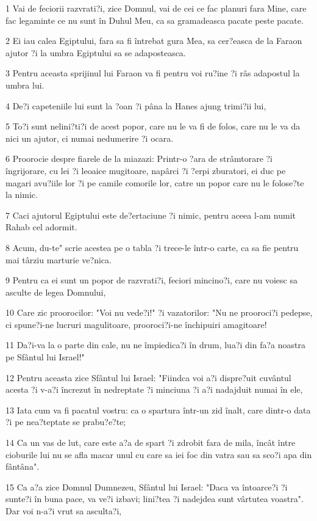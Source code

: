 \par 1 Vai de feciorii razvrati?i, zice Domnul, vai de cei ce fac planuri fara Mine, care fac legaminte ce nu sunt în Duhul Meu, ca sa gramadeasca pacate peste pacate.
\par 2 Ei iau calea Egiptului, fara sa fi întrebat gura Mea, sa cer?easca de la Faraon ajutor ?i la umbra Egiptului sa se adaposteasca.
\par 3 Pentru aceasta sprijinul lui Faraon va fi pentru voi ru?ine ?i râs adapostul la umbra lui.
\par 4 De?i capeteniile lui sunt la ?oan ?i pâna la Hanes ajung trimi?ii lui,
\par 5 To?i sunt nelini?ti?i de acest popor, care nu le va fi de folos, care nu le va da nici un ajutor, ci numai nedumerire ?i ocara.
\par 6 Proorocie despre fiarele de la miazazi: Printr-o ?ara de strâmtorare ?i îngrijorare, cu lei ?i leoaice mugitoare, napârci ?i ?erpi zburatori, ei duc pe magari avu?iile lor ?i pe camile comorile lor, catre un popor care nu le folose?te la nimic.
\par 7 Caci ajutorul Egiptului este de?ertaciune ?i nimic, pentru aceea l-am numit Rahab cel adormit.
\par 8 Acum, du-te" scrie acestea pe o tabla ?i trece-le într-o carte, ca sa fie pentru mai târziu marturie ve?nica.
\par 9 Pentru ca ei sunt un popor de razvrati?i, feciori mincino?i, care nu voiesc sa asculte de legea Domnului,
\par 10 Care zic proorocilor: "Voi nu vede?i!" ?i vazatorilor: "Nu ne prooroci?i pedepse, ci spune?i-ne lucruri magulitoare, prooroci?i-ne închipuiri amagitoare!
\par 11 Da?i-va la o parte din cale, nu ne împiedica?i în drum, lua?i din fa?a noastra pe Sfântul lui Israel!"
\par 12 Pentru aceasta zice Sfântul lui Israel: "Fiindca voi a?i dispre?uit cuvântul acesta ?i v-a?i încrezut în nedreptate ?i minciuna ?i a?i nadajduit numai în ele,
\par 13 Iata cum va fi pacatul vostru: ca o spartura într-un zid înalt, care dintr-o data ?i pe nea?teptate se prabu?e?te;
\par 14 Ca un vas de lut, care este a?a de spart ?i zdrobit fara de mila, încât între cioburile lui nu se afla macar unul cu care sa iei foc din vatra sau sa sco?i apa din fântâna".
\par 15 Ca a?a zice Domnul Dumnezeu, Sfântul lui Israel: "Daca va întoarce?i ?i sunte?i în buna pace, va ve?i izbavi; lini?tea ?i nadejdea sunt vârtutea voastra". Dar voi n-a?i vrut sa asculta?i,
